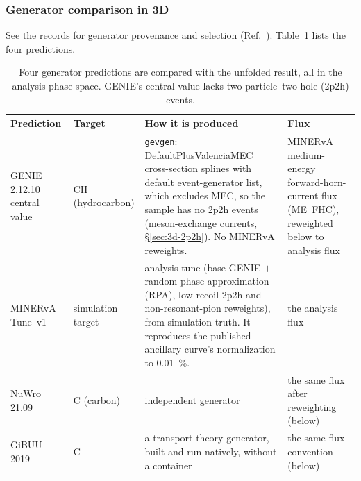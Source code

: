 \subsubsection{Generator comparison in 3D}
\label{sec:3d-models}
 See the records for generator provenance and selection (Ref.~\cite{NoteRecords2026}). Table~\ref{tab:3d-generators} lists the four predictions. 

\begin{table}[htbp]
  \caption[Generator predictions]{Four generator predictions are compared with the unfolded result, all in the analysis phase space. GENIE's central value lacks two-particle--two-hole (2p2h) events.}
  \label{tab:3d-generators}
  \centering\small
  \begin{tabular}{@{}p{}p{}p{}p{}@{}}
    \toprule
    Prediction & Target & How it is produced & Flux \\
    \midrule
    GENIE 2.12.10 central value~\cite{Andreopoulos:2009rq} & CH (hydrocarbon) & \texttt{gevgen}: DefaultPlusValenciaMEC cross-section splines with default event-generator list, which excludes MEC, so the sample has no 2p2h events (meson-exchange currents, \S\ref{sec:3d-2p2h}). No MINERvA reweights. & MINERvA medium-energy forward-horn-current flux (ME~FHC), reweighted below to analysis flux \\
    MINERvA Tune~v1 & simulation target & analysis tune (base GENIE $+$ random phase approximation (RPA), low-recoil 2p2h and non-resonant-pion reweights), from simulation truth. It reproduces the published ancillary curve's normalization to \SI{0.01}{\percent}. & the analysis flux \\
    NuWro 21.09~\cite{Golan:2012wx} & C (carbon) & independent generator & the same flux after reweighting (below) \\
    GiBUU 2019~\cite{Buss:2011mx} & C & a transport-theory generator, built and run natively, without a container & the same flux convention (below) \\
    \bottomrule
  \end{tabular}
\end{table}

